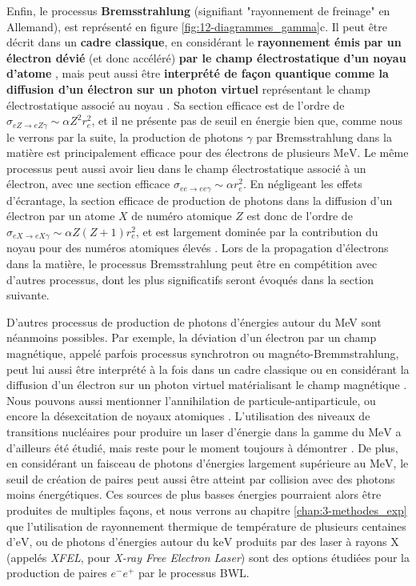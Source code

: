 \begin{refsection}
Enfin, le processus \textbf{Bremsstrahlung} (signifiant "rayonnement de freinage" en Allemand), est représenté en figure \ref{fig:12-diagrammes_gamma}c. Il peut être décrit dans un \textbf{cadre classique}, en considérant le \textbf{rayonnement émis par un électron dévié} (et donc accéléré) \textbf{par le champ électrostatique d'un noyau d'atome} \parencite{jackson_2009}, mais peut aussi être \textbf{interprété de façon quantique comme la diffusion d'un électron sur un photon virtuel} représentant le champ électrostatique associé au noyau \parencite{jackson_2009}. Sa section efficace est de l'ordre de \parencite{carron_2007} $\sigma_{e Z \to e Z \gamma} \sim \alpha Z^2 r_e^2$, et il ne présente pas de seuil en énergie bien que, comme nous le verrons par la suite, la production de photons $\gamma$ par Bremsstrahlung dans la matière est principalement efficace pour des électrons de plusieurs $\si{\MeV}$. Le même processus peut aussi avoir lieu dans le champ électrostatique associé à un électron, avec une section efficace \parencite{carron_2007} $\sigma_{ee\to ee \gamma} \sim \alpha r_e^2$. En négligeant les effets d'écrantage, la section efficace de production de photons dans la diffusion d'un électron par un atome $X$ de numéro atomique $Z$ est donc de l'ordre de $\sigma_{e X \to e X \gamma} \sim \alpha Z(Z+1) r_e^2$, et est largement dominée par la contribution du noyau pour des numéros atomiques élevés \parencite{carron_2007}. Lors de la propagation d'électrons dans la matière, le processus Bremsstrahlung peut être en compétition avec d'autres processus, dont les plus significatifs seront évoqués dans la section suivante.

D'autres processus de production de photons d'énergies autour du MeV sont néanmoins possibles. Par exemple, la déviation d'un électron par un champ magnétique, appelé parfois processus synchrotron ou magnéto-Bremmstrahlung, peut lui aussi être interprété à la fois dans un cadre classique ou en considérant la diffusion d'un électron sur un photon virtuel matérialisant le champ magnétique \parencite{lieu_1993}. Nous pouvons aussi mentionner l'annihilation de particule-antiparticule, ou encore la désexcitation de noyaux atomiques \parencite{diehl_2001}. L'utilisation des niveaux de transitions nucléaires pour produire un laser d'énergie dans la gamme du $\si{\MeV}$ a d'ailleurs été étudié, mais reste pour le moment toujours à démontrer \parencite{rivlin_2007}. De plus, en considérant un faisceau de photons d'énergies largement supérieure au $\si{\MeV}$, le seuil de création de paires peut aussi être atteint par collision avec des photons moins énergétiques. Ces sources de plus basses énergies pourraient alors être produites de multiples façons, et nous verrons au chapitre \ref{chap:3-methodes_exp} que l'utilisation de rayonnement thermique de température de plusieurs centaines d'$\si{\eV}$, ou de photons d'énergies autour du $\si{\keV}$ produits par des laser à rayons X (appelés \textit{XFEL}, pour \textit{X-ray Free Electron Laser}) sont des options étudiées pour la production de paires $e^-e^+$ par le processus BWL.


\end{refsection}
